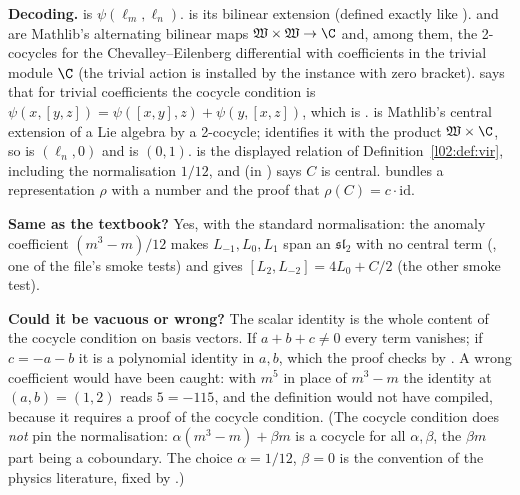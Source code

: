 \begin{dictionary}
\textbf{Decoding.}  is $\psi(\ell_m,\ell_n)$.  is its bilinear
extension (defined exactly like ).  and
 are Mathlib's alternating bilinear maps $\ltwoW\times\ltwoW\to\C$ and,
among them, the 2-cocycles for the Chevalley--Eilenberg differential with coefficients in the
trivial module $\C$ (the trivial action is installed by the  instance with
zero bracket). \allowbreak{}\allowbreak{}\allowbreak{}\allowbreak{} says that for trivial coefficients the cocycle
condition is $\psi(x,[y,z]) = \psi([x,y],z)+\psi(y,[x,z])$, which is .
\allowbreak{} is Mathlib's central extension of a Lie algebra by a 2-cocycle;
 identifies it with the product $\ltwoW\times\C$, so  is $(\ell_n,0)$ and
 is $(0,1)$.  is the displayed relation of
Definition~\ref{l02:def:vir}, including the normalisation $1/12$, and  (in
) says $C$ is central.  bundles a representation $\rho$
with a number  and the proof that $\rho(C) = c\cdot\mathrm{id}$.

\textbf{Same as the textbook?} Yes, with the standard normalisation: the anomaly coefficient
$(m^3-m)/12$ makes $L_{-1},L_0,L_1$ span an $\mathfrak{sl}_2$ with no central term
(, one of the file's smoke tests) and gives $[L_2,L_{-2}] = 4L_0 + C/2$
(the other smoke test).

\textbf{Could it be vacuous or wrong?} The scalar identity  is the whole
content of the cocycle condition on basis vectors. If $a+b+c\ne0$ every term vanishes; if
$c=-a-b$ it is a polynomial identity in $a,b$, which the proof checks by . A wrong
coefficient would have been caught: with $m^5$ in place of $m^3-m$ the identity at $(a,b)=(1,2)$
reads $5 = -115$, and the definition  would not have compiled, because it requires a
proof of the cocycle condition. (The cocycle condition does \emph{not} pin the normalisation:
$\alpha(m^3-m)+\beta m$ is a cocycle for all $\alpha,\beta$, the $\beta m$ part being a coboundary.
The choice $\alpha = 1/12$, $\beta=0$ is the convention of the physics literature, fixed by
.)
\end{dictionary}

